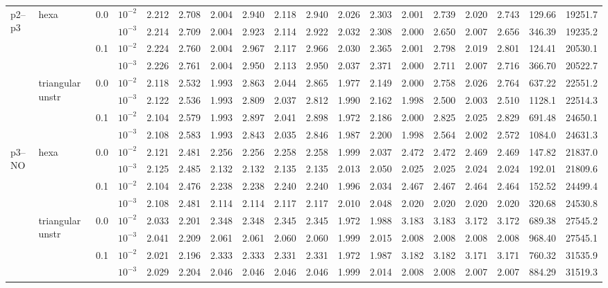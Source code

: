 \begin{longtable}{llclrrrrrrrrrrrrrr}
\multirow{8}{*}{p2--p3} & \multirow{4}{*}{hexa} & \multirow{2}{*}{0.0} & $10^{-2}$ & 2.212 & 2.708 & 2.004 & 2.940 & 2.118 & 2.940 & 2.026 & 2.303 & 2.001 & 2.739 & 2.020 & 2.743 & 129.66 & 19251.7 \\
& & & $10^{-3}$ & 2.214 & 2.709 & 2.004 & 2.923 & 2.114 & 2.922 & 2.032 & 2.308 & 2.000 & 2.650 & 2.007 & 2.656 & 346.39 & 19235.2 \\\cline{3-18}
& & \multirow{2}{*}{0.1} & $10^{-2}$ & 2.224 & 2.760 & 2.004 & 2.967 & 2.117 & 2.966 & 2.030 & 2.365 & 2.001 & 2.798 & 2.019 & 2.801 & 124.41 & 20530.1 \\
& & & $10^{-3}$ & 2.226 & 2.761 & 2.004 & 2.950 & 2.113 & 2.950 & 2.037 & 2.371 & 2.000 & 2.711 & 2.007 & 2.716 & 366.70 & 20522.7 \\\cline{2-18}
& \multirow{4}{*}{triangular unstr} & \multirow{2}{*}{0.0} & $10^{-2}$ & 2.118 & 2.532 & 1.993 & 2.863 & 2.044 & 2.865 & 1.977 & 2.149 & 2.000 & 2.758 & 2.026 & 2.764 & 637.22 & 22551.2 \\
& & & $10^{-3}$ & 2.122 & 2.536 & 1.993 & 2.809 & 2.037 & 2.812 & 1.990 & 2.162 & 1.998 & 2.500 & 2.003 & 2.510 & 1128.1 & 22514.3 \\\cline{3-18}
& & \multirow{2}{*}{0.1} & $10^{-2}$ & 2.104 & 2.579 & 1.993 & 2.897 & 2.041 & 2.898 & 1.972 & 2.186 & 2.000 & 2.825 & 2.025 & 2.829 & 691.48 & 24650.1 \\
& & & $10^{-3}$ & 2.108 & 2.583 & 1.993 & 2.843 & 2.035 & 2.846 & 1.987 & 2.200 & 1.998 & 2.564 & 2.002 & 2.572 & 1084.0 & 24631.3 \\\hline

\multirow{8}{*}{p3--NO} & \multirow{4}{*}{hexa} & \multirow{2}{*}{0.0} & $10^{-2}$ & 2.121 & 2.481 & 2.256 & 2.256 & 2.258 & 2.258 & 1.999 & 2.037 & 2.472 & 2.472 & 2.469 & 2.469 & 147.82 & 21837.0 \\
& & & $10^{-3}$ & 2.125 & 2.485 & 2.132 & 2.132 & 2.135 & 2.135 & 2.013 & 2.050 & 2.025 & 2.025 & 2.024 & 2.024 & 192.01 & 21809.6 \\\cline{3-18}
& & \multirow{2}{*}{0.1} & $10^{-2}$ & 2.104 & 2.476 & 2.238 & 2.238 & 2.240 & 2.240 & 1.996 & 2.034 & 2.467 & 2.467 & 2.464 & 2.464 & 152.52 & 24499.4 \\
& & & $10^{-3}$ & 2.108 & 2.481 & 2.114 & 2.114 & 2.117 & 2.117 & 2.010 & 2.048 & 2.020 & 2.020 & 2.020 & 2.020 & 320.68 & 24530.8 \\\cline{2-18}
& \multirow{4}{*}{triangular unstr} & \multirow{2}{*}{0.0} & $10^{-2}$ & 2.033 & 2.201 & 2.348 & 2.348 & 2.345 & 2.345 & 1.972 & 1.988 & 3.183 & 3.183 & 3.172 & 3.172 & 689.38 & 27545.2 \\
& & & $10^{-3}$ & 2.041 & 2.209 & 2.061 & 2.061 & 2.060 & 2.060 & 1.999 & 2.015 & 2.008 & 2.008 & 2.008 & 2.008 & 968.40 & 27545.1 \\\cline{3-18}
& & \multirow{2}{*}{0.1} & $10^{-2}$ & 2.021 & 2.196 & 2.333 & 2.333 & 2.331 & 2.331 & 1.972 & 1.987 & 3.182 & 3.182 & 3.171 & 3.171 & 760.32 & 31535.9 \\
& & & $10^{-3}$ & 2.029 & 2.204 & 2.046 & 2.046 & 2.046 & 2.046 & 1.999 & 2.014 & 2.008 & 2.008 & 2.007 & 2.007 & 884.29 & 31519.3 \\\hline


\end{longtable}

